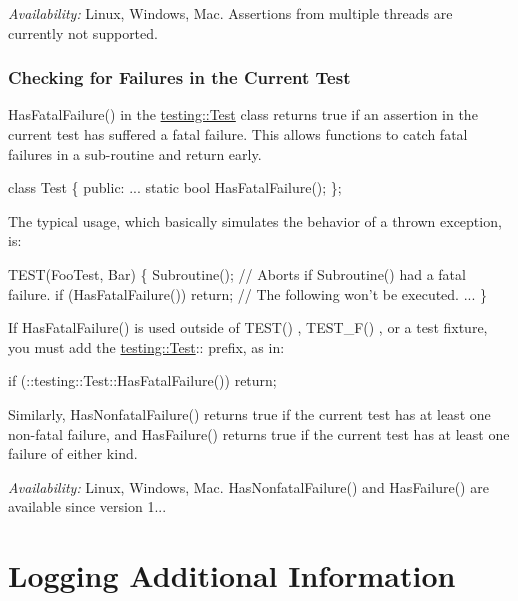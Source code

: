 {\itshape Availability\+:} Linux, Windows, Mac. Assertions from multiple threads are currently not supported.

\subsubsection*{Checking for Failures in the Current Test}

{\ttfamily Has\+Fatal\+Failure()} in the {\ttfamily \mbox{\hyperlink{classtesting_1_1_test}{testing\+::\+Test}}} class returns {\ttfamily true} if an assertion in the current test has suffered a fatal failure. This allows functions to catch fatal failures in a sub-\/routine and return early.


\begin{DoxyCode}
class Test \{
 public:
  ...
  static bool HasFatalFailure();
\};
\end{DoxyCode}


The typical usage, which basically simulates the behavior of a thrown exception, is\+:


\begin{DoxyCode}
TEST(FooTest, Bar) \{
  Subroutine();
  // Aborts if Subroutine() had a fatal failure.
  if (HasFatalFailure())
    return;
  // The following won't be executed.
  ...
\}
\end{DoxyCode}


If {\ttfamily Has\+Fatal\+Failure()} is used outside of {\ttfamily T\+E\+S\+T()} , {\ttfamily T\+E\+S\+T\+\_\+\+F()} , or a test fixture, you must add the {\ttfamily \mbox{\hyperlink{classtesting_1_1_test}{testing\+::\+Test}}\+:\+:} prefix, as in\+:


\begin{DoxyCode}
if (::testing::Test::HasFatalFailure())
  return;
\end{DoxyCode}


Similarly, {\ttfamily Has\+Nonfatal\+Failure()} returns {\ttfamily true} if the current test has at least one non-\/fatal failure, and {\ttfamily Has\+Failure()} returns {\ttfamily true} if the current test has at least one failure of either kind.

{\itshape Availability\+:} Linux, Windows, Mac. {\ttfamily Has\+Nonfatal\+Failure()} and {\ttfamily Has\+Failure()} are available since version 1...

\section*{Logging Additional Information}


